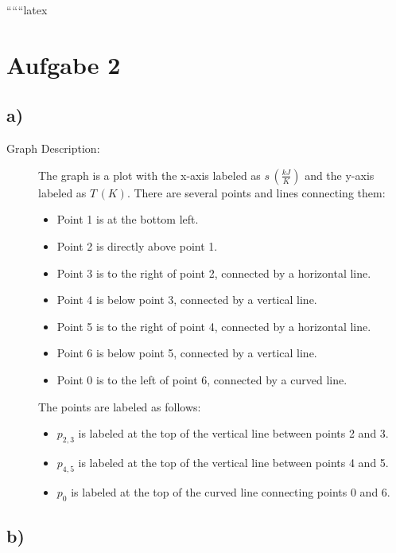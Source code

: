 
``````latex


\section*{Aufgabe 2}

\subsection*{a)}

\begin{description}
    \item[Graph Description:] The graph is a plot with the x-axis labeled as $s \, (\frac{kJ}{K})$ and the y-axis labeled as $T \, (K)$. There are several points and lines connecting them:
    \begin{itemize}
        \item Point 1 is at the bottom left.
        \item Point 2 is directly above point 1.
        \item Point 3 is to the right of point 2, connected by a horizontal line.
        \item Point 4 is below point 3, connected by a vertical line.
        \item Point 5 is to the right of point 4, connected by a horizontal line.
        \item Point 6 is below point 5, connected by a vertical line.
        \item Point 0 is to the left of point 6, connected by a curved line.
    \end{itemize}
    The points are labeled as follows:
    \begin{itemize}
        \item $p_{2,3}$ is labeled at the top of the vertical line between points 2 and 3.
        \item $p_{4,5}$ is labeled at the top of the vertical line between points 4 and 5.
        \item $p_0$ is labeled at the top of the curved line connecting points 0 and 6.
    \end{itemize}
\end{description}

\subsection*{b)}


